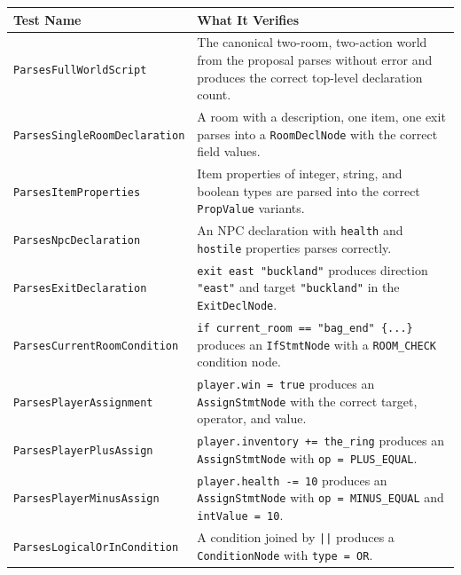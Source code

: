 \documentclass[12pt, a4paper]{article}
\begin{document}
\begin{longtable}{p{6.5cm} p{7cm}}
\toprule
\textbf{Test Name} & \textbf{What It Verifies} \\
\midrule
\endhead
\texttt{ParsesFullWorldScript} &
  The canonical two-room, two-action world from the proposal parses without error
  and produces the correct top-level declaration count. \\[4pt]

\texttt{ParsesSingleRoomDeclaration} &
  A room with a description, one item, one exit parses into a
  \texttt{RoomDeclNode} with the correct field values. \\[4pt]

\texttt{ParsesItemProperties} &
  Item properties of integer, string, and boolean types are parsed into the
  correct \texttt{PropValue} variants. \\[4pt]

\texttt{ParsesNpcDeclaration} &
  An NPC declaration with \texttt{health} and \texttt{hostile} properties
  parses correctly. \\[4pt]

\texttt{ParsesExitDeclaration} &
  \texttt{exit east "buckland"} produces direction \texttt{"east"} and target
  \texttt{"buckland"} in the \texttt{ExitDeclNode}. \\[4pt]

\texttt{ParsesCurrentRoomCondition} &
  \texttt{if current\_room == "bag\_end" \{...\}} produces an
  \texttt{IfStmtNode} with a \texttt{ROOM\_CHECK} condition node. \\[4pt]

\texttt{ParsesPlayerAssignment} &
  \texttt{player.win = true} produces an \texttt{AssignStmtNode} with the correct
  target, operator, and value. \\[4pt]

\texttt{ParsesPlayerPlusAssign} &
  \texttt{player.inventory += the\_ring} produces an \texttt{AssignStmtNode}
  with \texttt{op = PLUS\_EQUAL}. \\[4pt]

\texttt{ParsesPlayerMinusAssign} &
  \texttt{player.health -= 10} produces an \texttt{AssignStmtNode}
  with \texttt{op = MINUS\_EQUAL} and \texttt{intValue = 10}. \\[4pt]

\texttt{ParsesLogicalOrInCondition} &
  A condition joined by \texttt{||} produces a \texttt{ConditionNode} with
  \texttt{type = OR}. \\[4pt]


\end{longtable}
\end{document}
